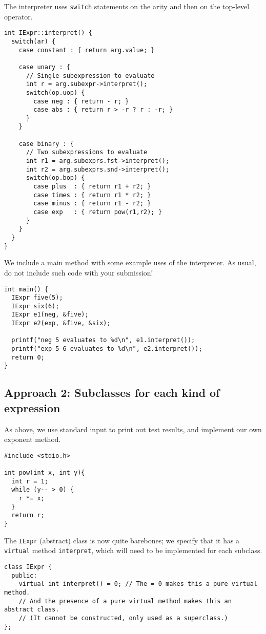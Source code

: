 \documentclass[11pt]{article}
\begin{document}
The interpreter uses \texttt{switch} statements
on the arity and then on the top-level operator.
\begin{verbatim}
int IExpr::interpret() {
  switch(ar) {
    case constant : { return arg.value; }

    case unary : {
      // Single subexpression to evaluate
      int r = arg.subexpr->interpret();
      switch(op.uop) {
        case neg : { return - r; }
        case abs : { return r > -r ? r : -r; }
      }
    }

    case binary : {
      // Two subexpressions to evaluate
      int r1 = arg.subexprs.fst->interpret();
      int r2 = arg.subexprs.snd->interpret();
      switch(op.bop) {
        case plus  : { return r1 + r2; }
        case times : { return r1 * r2; }
        case minus : { return r1 - r2; }
        case exp   : { return pow(r1,r2); }
      }
    }
  }
}
\end{verbatim}

We include a main method with some example uses of the interpreter.
As usual, do not include such code with your submission!
\begin{verbatim}
int main() {
  IExpr five(5);
  IExpr six(6);
  IExpr e1(neg, &five);
  IExpr e2(exp, &five, &six);

  printf("neg 5 evaluates to %d\n", e1.interpret());
  printf("exp 5 6 evaluates to %d\n", e2.interpret());
  return 0;
}
\end{verbatim}

\subsection*{Approach 2: Subclasses for each kind of expression}
\label{sec:org779c62b}
As above, we use standard input to print out test results,
and implement our own exponent method.
\begin{verbatim}
#include <stdio.h>

int pow(int x, int y){
  int r = 1;
  while (y-- > 0) {
    r *= x;
  }
  return r;
}
\end{verbatim}

The \texttt{IExpr} (abstract) class is now quite barebones; we specify
that it has a \texttt{virtual} method \texttt{interpret}, which will need to be implemented
for each subclass.
\begin{verbatim}
class IExpr {
  public:
    virtual int interpret() = 0; // The = 0 makes this a pure virtual method.
    // And the presence of a pure virtual method makes this an abstract class.
    // (It cannot be constructed, only used as a superclass.)
};
\end{verbatim}
\end{document}
